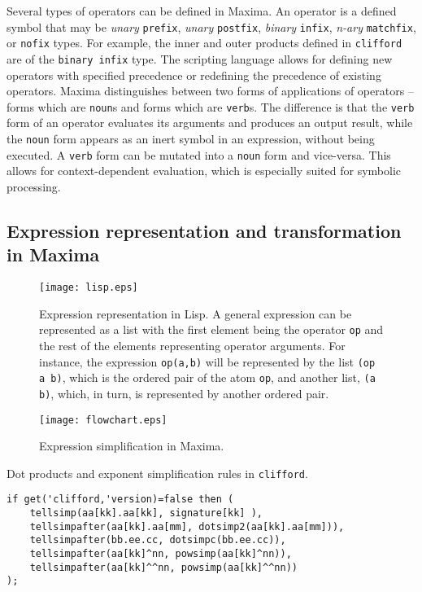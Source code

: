 \documentclass[twoside,reqno,11pt]{amsart}
\theoremstyle{definition}
\theoremstyle{remark}
\numberwithin{equation}{section}
\newcommand{\symb}[1]{{\tt #1}}
\begin{document}
Several types of operators can be defined in Maxima.
An operator is a defined symbol that may be  \textit{unary} \symb{prefix}, \textit{unary} \symb{postfix}, \textit{binary} \symb{infix}, \textit{n-ary} \symb{matchfix}, or \symb{nofix} types.
For example, the inner and outer products defined in \symb{clifford} are of the \symb{binary infix} type.
The scripting language allows for defining new operators with specified precedence or redefining the precedence of existing operators.
Maxima distinguishes between two forms of applications of operators -- forms which are \symb{noun}s and forms which are \symb{verb}s.
The difference is that the \symb{verb} form of an operator evaluates its arguments and produces an output result, while the \symb{noun} form appears as an inert symbol in an expression, without being executed.
A \symb{verb} form can be mutated into a \symb{noun} form and vice-versa.
This allows for context-dependent evaluation, which is especially suited for symbolic processing.

\subsection{Expression representation and transformation in Maxima}
\label{sec:expr}

\begin{figure}[ht]
\texttt{[image: lisp.eps]}
\caption{\label{fig:lisp}Expression representation in Lisp. A general expression can be represented as a list with the first element being the operator  \symb{op} and the rest of the elements representing operator arguments. For instance, the expression \symb{op(a,b)} will be represented by the list \symb{(op a b)}, which is the ordered pair of the atom \symb{op}, and another list, \symb{(a b)}, which, in turn, is represented by another ordered pair.}
\end{figure}

\begin{figure}[ht]
\texttt{[image: flowchart.eps]}	
\caption{Expression simplification in Maxima.}
\label{fig:flowchart}
\end{figure}

\begin{listing}
\caption{\label{lst:definitions}Dot products and exponent simplification rules in   \symb{clifford}.}
{\color{labelcolor}\begin{verbatim}
if get('clifford,'version)=false then (
	tellsimp(aa[kk].aa[kk], signature[kk] ),
	tellsimpafter(aa[kk].aa[mm], dotsimp2(aa[kk].aa[mm])),
	tellsimpafter(bb.ee.cc, dotsimpc(bb.ee.cc)),
	tellsimpafter(aa[kk]^nn, powsimp(aa[kk]^nn)),
	tellsimpafter(aa[kk]^^nn, powsimp(aa[kk]^^nn))
);
\end{verbatim}}
\end{listing}
\end{document}
